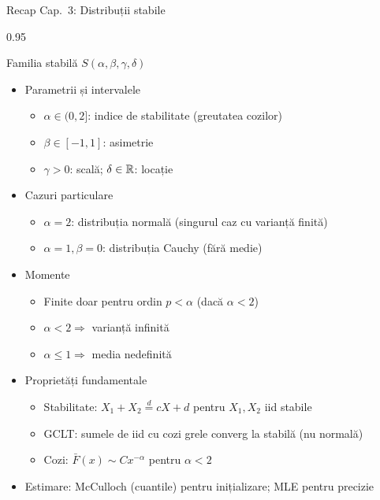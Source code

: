 \documentclass[9pt, aspectratio=169, t]{beamer}
\begin{document}
\begin{frame}[shrink=25]{Recap Cap.~3: Distribuții stabile}
\begin{cminipage}{0.95\textwidth}
\begin{block}{Familia stabilă $S(\alpha, \beta, \gamma, \delta)$}
\begin{itemize}\setlength{\itemsep}{0pt}
    \item Parametrii și intervalele
    \begin{itemize}\setlength{\itemsep}{0pt}
        \item $\alpha \in (0, 2]$: indice de stabilitate (greutatea cozilor)
        \item $\beta \in [-1, 1]$: asimetrie
        \item $\gamma > 0$: scală; $\delta \in \mathbb{R}$: locație
    \end{itemize}
    \item Cazuri particulare
    \begin{itemize}\setlength{\itemsep}{0pt}
        \item $\alpha = 2$: distribuția normală (singurul caz cu varianță finită)
        \item $\alpha = 1, \beta = 0$: distribuția Cauchy (fără medie)
    \end{itemize}
    \item Momente
    \begin{itemize}\setlength{\itemsep}{0pt}
        \item Finite doar pentru ordin $p < \alpha$ (dacă $\alpha < 2$)
        \item $\alpha < 2 \Rightarrow$ varianță infinită
        \item $\alpha \le 1 \Rightarrow$ media nedefinită
    \end{itemize}
    \item Proprietăți fundamentale
    \begin{itemize}\setlength{\itemsep}{0pt}
        \item Stabilitate: $X_1 + X_2 \stackrel{d}{=} cX + d$ pentru $X_1, X_2$ iid stabile
        \item GCLT: sumele de iid cu cozi grele converg la stabilă (nu normală)
        \item Cozi: $\bar F(x) \sim C x^{-\alpha}$ pentru $\alpha < 2$
    \end{itemize}
    \item Estimare: McCulloch (cuantile) pentru inițializare; MLE pentru precizie
\end{itemize}
\end{block}
\end{cminipage}
\end{frame}
\end{document}
